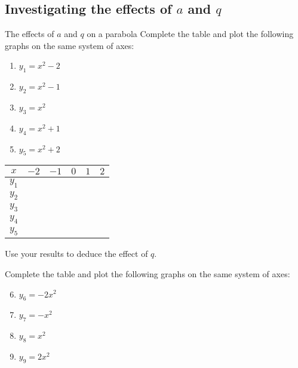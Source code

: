 \subsection*{Investigating the effects of $a$ and $q$ }
\begin{Investigation}{The effects of $a$ and $q$ on a parabola}
Complete the table and plot the following graphs on the same system of axes:
    \begin{enumerate}[noitemsep, label=\textbf{\arabic*}. ] 
    \item $y_1={x}^{2}-2$
    \item $y_2={x}^{2}-1$
    \item $y_3={x}^{2}$
    \item $y_4={x}^{2}+1$
    \item $y_5={x}^{2}+2$
        \end{enumerate}

\begin{table}[H]
  \begin{center}
    \begin{tabular}{|c|c|c|c|c|c|}\hline
      $x$ & $-2$ & $-1$ & $0$ & $1$ & $2$ \\ \hline
      $y_1$ & \hspace{1cm}  & \hspace{1cm}  & \hspace{1cm}  & \hspace{1cm}  & \hspace{1cm}  \\ \hline
      $y_2$ & & & & & \\ \hline
      $y_3$ & & & & & \\ \hline
      $y_4$ & & & & & \\ \hline
      $y_5$ & & & & & \\ \hline
    \end{tabular}
  \end{center}
\end{table}
Use your results to deduce the effect of $q$.

Complete the table and plot the following graphs on the same system of axes:
\begin{enumerate}[noitemsep, label=\textbf{\arabic*}. ] \setcounter{enumi}{5}
\item $y_6=-2{x}^{2}$
\item $y_7=-{x}^{2}$
\item $y_8={x}^{2}$
\item $y_9=2{x}^{2}$
\end{enumerate}


\end{Investigation}
